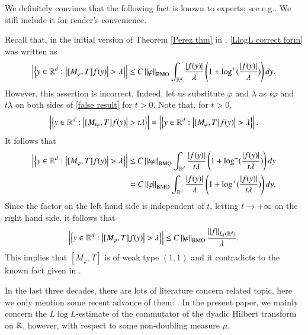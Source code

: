 \documentclass[leqno]{amsart}
\begin{document}
 We definitely convince that the following fact is known to experts; see e.g.\cite{CF2003,CF2007, PP2001}. We still include it for reader's convenience.
\begin{remark}
Recall that, in the initial version of Theorem \ref{Perez thm} in \cite{Pe1995}, \eqref{LlogL correct form} was written as
	\begin{align}\label{false result}
		\left|\set{y\in\RR^{d}:\left|[M_{\varphi},T]f(y)\right|>\lambda}\right|\leq C\Norm{\varphi}_{\BMO}\int_{\RR^{d}}\frac{|f(y)|}{\lambda}\left(1+\log^{+}(\frac{|f(y)|}{\lambda})\right)dy.
	\end{align}
However, this assertion is incorrect. Indeed, let us substitute $\varphi$ and $\lambda$ as $t\varphi$ and $t\lambda$ on both sides of \eqref{false result} for $t>0$. Note that, for $t>0$,
\begin{align*}
	\left|\set{y\in\RR^{d}:\left|[M_{t\varphi},T]f(y)\right|>t\lambda}\right|
	=\left|\set{y\in\RR^{d}:\left|[M_{\varphi},T]f(y)\right|>\lambda}\right|.
\end{align*}
It follows that
\begin{align*}
	\left|\set{y\in\RR^{d}:\left|[M_{\varphi},T]f(y)\right|>\lambda}\right|\leq C\Norm{t\varphi}_{\BMO}\int_{\RR^{d}}\frac{|f(y)|}{t\lambda}\left(1+\log^{+}(\frac{|f(y)|}{t\lambda})\right)dy\\
	=C\Norm{\varphi}_{\BMO}\int_{\RR^{d}}\frac{|f(y)|}{\lambda}\left(1+\log^{+}(\frac{|f(y)|}{t\lambda})\right)dy.
\end{align*}
Since the factor on the left hand side is independent of $t$, letting $t\to+\infty$ on the right hand side, it follows that
\begin{align*}
	\left|\set{y\in\RR^{d}:\left|[M_{\varphi},T]f(y)\right|>\lambda}\right|\leq C\Norm{\varphi}_{\BMO}\frac{\Norm{f}_{L_{1}(\RR^{d})}}{\lambda}.
\end{align*}
This implies that $[M_{\varphi},T]$ is of weak type $(1,1)$ and it contradicts to the known fact given in \cite[Section 5]{Pe1995}. 
\end{remark}

In the last three decades, there are lots of literature concern related topic, here we only mention some recent advance of them: \cite{FSZ2024,HLW2017,Hy2021,LXY2024,Wi2020}. In the present paper, we mainly concern the $L\log L$-estimate of the commutator of the dyadic Hilbert transform on ${\mathbb R}$, however, with respect to some non-doubling measure $\mu$.
\end{document}
